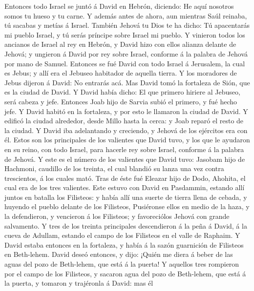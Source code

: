  Entonces todo Israel se juntó á David en Hebrón, diciendo:
He aquí nosotros somos tu hueso y tu carne.  Y además antes
de ahora, aun mientras Saúl reinaba, tú sacabas y metías á Israel.
También Jehová tu Dios te ha dicho: Tú apacentarás mi pueblo Israel, y
tú serás príncipe sobre Israel mi pueblo.  Y vinieron todos
los ancianos de Israel al rey en Hebrón, y David hizo con ellos alianza
delante de Jehová; y ungieron á David por rey sobre Israel, conforme á
la palabra de Jehová por mano de Samuel.  Entonces se fué
David con todo Israel á Jerusalem, la cual es Jebus; y allí era el
Jebuseo habitador de aquella tierra.  Y los moradores de
Jebus dijeron á David: No entrarás acá. Mas David tomó la fortaleza de
Sión, que es la ciudad de David.  Y David había dicho: El
que primero hiriere al Jebuseo, será cabeza y jefe. Entonces Joab hijo
de Sarvia subió el primero, y fué hecho jefe.  Y David
habitó en la fortaleza, y por esto le llamaron la ciudad de David.
 Y edificó la ciudad alrededor, desde Millo hasta la cerca:
y Joab reparó el resto de la ciudad.  Y David iba
adelantando y creciendo, y Jehová de los ejércitos era con él.
 Estos son los principales de los valientes que David tuvo,
y los que le ayudaron en su reino, con todo Israel, para hacerle rey
sobre Israel, conforme á la palabra de Jehová.  Y este es
el número de los valientes que David tuvo: Jasobam hijo de Hachmoni,
caudillo de los treinta, el cual blandió su lanza una vez contra
trescientos, á los cuales mató.  Tras de éste fué Eleazar
hijo de Dodo, Ahohita, el cual era de los tres valientes. 
Este estuvo con David en Pasdammin, estando allí juntos en batalla los
Filisteos: y había allí una suerte de tierra llena de cebada, y huyendo
el pueblo delante de los Filisteos,  Pusiéronse ellos en
medio de la haza, y la defendieron, y vencieron á los Filisteos; y
favoreciólos Jehová con grande salvamento.  Y tres de los
treinta principales descendieron á la peña á David, á la cueva de
Adullam, estando el campo de los Filisteos en el valle de Raphaim.
 Y David estaba entonces en la fortaleza, y había á la
sazón guarnición de Filisteos en Beth-lehem.  David deseó
entonces, y dijo: ¡Quién me diera á beber de las aguas del pozo de
Beth-lehem, que está á la puerta!  Y aquellos tres
rompieron por el campo de los Filisteos, y sacaron agua del pozo de
Beth-lehem, que está á la puerta, y tomaron y trajéronla á David: mas él
